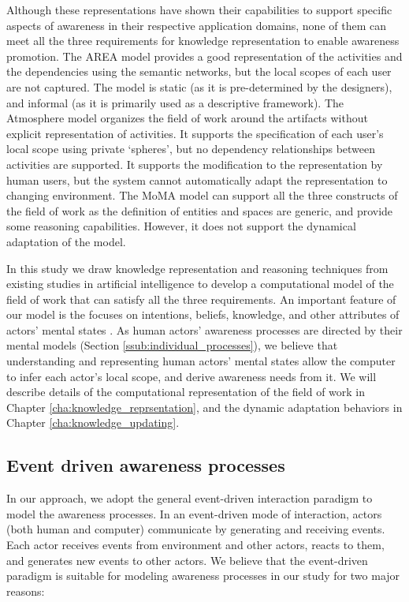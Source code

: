 Although these representations have shown their capabilities to support specific aspects of awareness in their respective application domains, none of them can meet all the three requirements for knowledge representation to enable awareness promotion. The AREA model provides a good representation of the activities and the dependencies using the semantic networks, but the local scopes of each user are not captured. The model is static (as it is pre-determined by the designers), and informal (as it is primarily used as a descriptive framework). The Atmosphere model organizes the field of work around the artifacts without explicit representation of activities. It supports the specification of each user's local scope using private `spheres', but no dependency relationships between activities are supported. It supports the modification to the representation by human users, but the system cannot automatically adapt the representation to changing environment. The MoMA model can support all the three constructs of the field of work as the definition of entities and spaces are generic, and provide some reasoning capabilities. However, it does not support the dynamical adaptation of the model.

In this study we draw knowledge representation and reasoning techniques from existing studies in artificial intelligence to develop a computational model of the field of work that can satisfy all the three requirements. An important feature of our model is the focuses on intentions, beliefs, knowledge, and other attributes of actors' mental states \cite{grosz1996collaborative}. As human actors' awareness processes are directed by their mental models (Section \ref{ssub:individual_processes}), we believe that understanding and representing human actors' mental states allow the computer to infer each actor's local scope, and derive awareness needs from it. We will describe details of the computational representation of the field of work in Chapter \ref{cha:knowledge_reprsentation}, and the dynamic adaptation behaviors in Chapter \ref{cha:knowledge_updating}.

\subsection{Event driven awareness processes} %
\label{sub:event_driven_awareness_processes}
In our approach, we adopt the general event-driven interaction paradigm \cite{Etzion2010} to model the awareness processes. In an event-driven mode of interaction, actors (both human and computer) communicate by generating and receiving events. Each actor receives events from environment and other actors, reacts to them, and generates new events to other actors. We believe that the event-driven paradigm is suitable for modeling awareness processes in our study for two major reasons:

